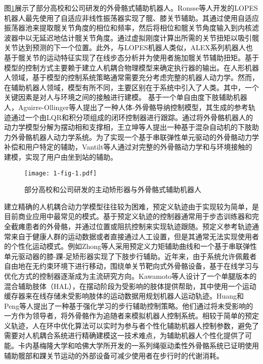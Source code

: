 图\ref{fig:1-1}展示了部分高校和公司研发的外骨骼式辅助机器人。Ronsse等人\cite{ronsseOscillatorbasedAssistanceCyclical2011}开发的LOPES机器人最先使用了自适应非线性振荡器实现了髋、膝关节辅助。其通过使用自适应振荡器池来提取髋关节角度的相位和频率，然后将相位和髋关节角度输入到内核滤波器中以无延迟地估计髋关节角度。通过虚拟刚度计算出所需的关节扭矩以吸引髋关节达到预测的下一个位置。此外，与LOPES机器人类似，ALEX系列机器人\cite{winfreeDesignMinimallyConstraining2011,stegallVariableDampingForce2017,hidayahGaitAdaptationUsing2020}也基于髋关节的运动特征实现了在线步态分析并为使用者施加髋关节辅助扭矩。基于模型的控制方式主要赖于建立人机耦合物理模型来确定执行器的输出。在人形机器人领域，基于模型的控制系统策略通常需要充分考虑完整的机器人动力学。然而，在辅助机器人领域，模型有所不同，主要区别在于系统中引入了人类。其中，一个关键因素是对人与环境之间的接触进行建模\cite{youngStateArtFuture2017}。 基于一个单自由度下肢辅助机器人，Aguirre-Ollinger等人\cite{aguirre-ollingerInertiaCompensationControl2012}提出了一种人体-外骨骼导纳控制模型，其生成的参考轨迹通过一个由LQR和积分项组成的闭环控制器进行跟踪。通过将外骨骼机器人的动力学模型分解为摆动相和支撑相，王立坤等人\cite{WangXiaZhiZhuLiWaiGuGeJiQiRenKongZhiXiTongRenJiGongRongCeLueYanJiu2019}提出一种基于混杂自动机的下肢助力外骨骼机器人动力学系统。为了实现一个基于串联弹性单元驱动的外骨骼动力学补偿和用户特定的辅助，Vantilt等人\cite{vantiltModelbasedControlExoskeletons2019}通过对完整的外骨骼动力学和与环境接触的建模，实现了用户由坐到站的辅助。

\begin{figure}[h]
  \centering
  \texttt{[image: 1-fig-1.pdf]}
  \caption{部分高校和公司研发的主动矫形器与外骨骼式辅助机器人}
  \label{fig:1-1}
\end{figure}

建立精确的人机耦合动力学模型往往较为困难，预定义轨迹由于实现较为简单，是目前商业应用中最常见的模式。基于预定义轨迹的控制器通常用于步态训练器和完全截瘫患者的外骨骼，并通过位置或阻抗控制来实现轨迹跟随。预定义参考轨迹通常来自于健康人群的运动数据或者直接通过人工设置，但是其通常无法实现使用者的个性化运动模式。例如Zhong等人\cite{zhongGaitSymmetryEnhancement2022}采用预定义力矩辅助曲线和一个基于串联弹性单元驱动器的膝-踝-足矫形器实现了下肢步行辅助。近年来，由于系统允许佩戴者自由地在无约束环境下进行移动，围绕单关节靶向式外骨骼设备，基于在线学习与优化方式的控制器逐渐成为主流研究方向。Kawamoto等人\cite{kawamotoModificationHemiplegicCompensatory2015,kawamotoDevelopmentAssistController2014a}设计了一个单腿版本的混合辅助肢体（HAL），在摆动阶段为受影响的肢体提供帮助，其中使用一个运动缓存器来在线存储未受影响肢体的运动数据用规划机器人运动轨迹。Huang和Peng等人\cite{huangLearningbasedWalkingAssistance2018,pengDataDrivenReinforcementLearning2020}提出了一种基于强化学习的步行辅助控制策略。他们通过将未受影响的一方作为领导者，将外骨骼作为追随者来模拟机器人控制系统。相较于简单的预定义轨迹，人在环中优化算法可以实时为参与者个性化辅助机器人控制参数，避免了需要对人机耦合系统进行精确建模这一技术难点，为辅助机器人个性化提供了可能。卡内基梅隆大学和哈佛大学\cite{dingHumanintheloopOptimizationHip2018a,zhangHumanintheloopOptimizationExoskeleton2017a,awadSoftRoboticExosuit2017}所开发的一系列绳驱动柔性外骨骼系统已证明使用辅助髋部和踝关节运动的外部设备可减少使用者在步行时的代谢消耗。

